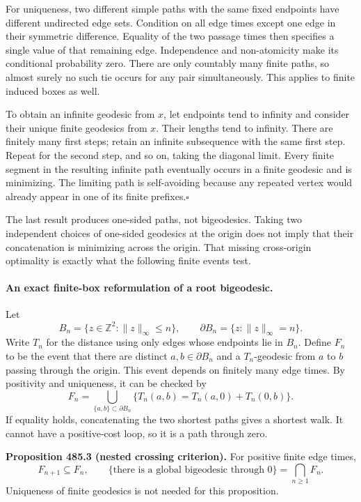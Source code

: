 \documentclass[11pt]{article}
\begin{document}
For uniqueness, two different simple paths with the same fixed endpoints
have different undirected edge sets. Condition on all edge times except
one edge in their symmetric difference. Equality of the two passage
times then specifies a single value of that remaining edge. Independence
and non-atomicity make its conditional probability zero. There are only
countably many finite paths, so almost surely no such tie occurs for any
pair simultaneously. This applies to finite induced boxes as well.

To obtain an infinite geodesic from $x$, let endpoints tend to infinity
and consider their unique finite geodesics from $x$. Their lengths tend
to infinity. There are finitely many first steps; retain an infinite
subsequence with the same first step. Repeat for the second step, and
so on, taking the diagonal limit. Every finite segment in the resulting
infinite path eventually occurs in a finite geodesic and is minimizing.
The limiting path is self-avoiding because any repeated vertex would
already appear in one of its finite prefixes.\hfill$\square$

The last result produces one-sided paths, not bigeodesics. Taking two
independent choices of one-sided geodesics at the origin does not imply
that their concatenation is minimizing across the origin. That missing
cross-origin optimality is exactly what the following finite events test.

\paragraph{An exact finite-box reformulation of a root bigeodesic.}
Let
\[
 B_n=\{z\in\mathbb Z^2:\|z\|_\infty\leq n\},\qquad
 \partial B_n=\{z:\|z\|_\infty=n\}.
\]
Write $T_n$ for the distance using only edges whose endpoints lie in
$B_n$. Define $F_n$ to be the event that there are distinct
$a,b\in\partial B_n$ and a $T_n$-geodesic from $a$ to $b$ passing
through the origin. This event depends on finitely many edge times.
By positivity and uniqueness, it can be checked by
\begin{equation}\label{ra485:finiteevent}
 F_n=\bigcup_{\{a,b\}\subset\partial B_n}
 \{T_n(a,b)=T_n(a,0)+T_n(0,b)\}.
\end{equation}
If equality holds, concatenating the two shortest paths gives a shortest
walk. It cannot have a positive-cost loop, so it is a path through zero.

\textbf{Proposition 485.3 (nested crossing criterion).}
For positive finite edge times,
\[
 F_{n+1}\subseteq F_n,
 \qquad
 \{\text{there is a global bigeodesic through }0\}
                          =\bigcap_{n\geq1}F_n.
\]
Uniqueness of finite geodesics is not needed for this proposition.
\end{document}
